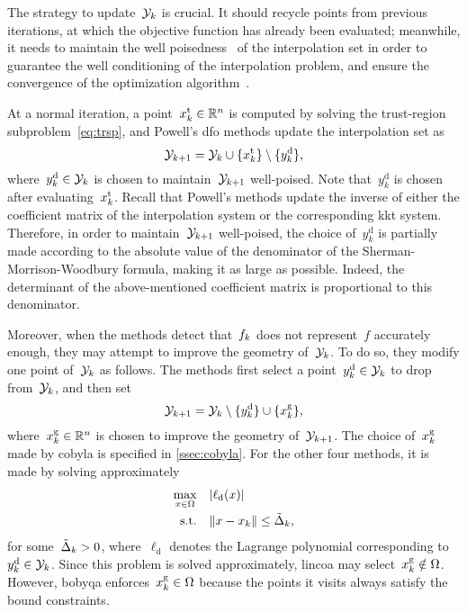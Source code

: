 \documentclass[11pt,draft]{article}
\numberwithin{equation}{section}
\newcommand{\R}{\mathbb{R}}
\newcommand{\abs}[2][]{#1\lvert#2#1\rvert}
\newcommand{\norm}[2][]{#1\lVert#2#1\rVert}
\newcommand{\set}[2][]{#1\{#2#1\}}
\newcommand{\drop}{{\text{d}}}
\newcommand{\fset}{\Omega}
\newcommand{\geo}{{\text{g}}}
\newcommand{\iter}[1][k]{x\ifthenelse{\equal{#1}{}}{}{_{#1}}}
\newcommand{\obj}{f}
\newcommand{\objm}[1][k]{\obj\ifthenelse{\equal{#1}{}}{}{_{#1}}}
\newcommand{\radalt}[1][k]{\tilde{\Delta}\ifthenelse{\equal{#1}{}}{}{_{#1}}}
\newcommand{\st}{\text{s.t.}}
\newcommand{\tst}{{\text{t}}}
\newcommand{\xpt}[1][k]{\mathcal{Y}\ifthenelse{\equal{#1}{}}{}{_{#1}}}
\begin{document}
The strategy to update~$\xpt$ is crucial.
It should recycle points from previous iterations, at which the objective function has already been evaluated; meanwhile, it needs to maintain the well poisedness~\cite{Sauer_Xu_1995,Conn_Scheinberg_Vicente_2009b} of the interpolation set in order to guarantee the well conditioning of the interpolation problem, and ensure the convergence of the optimization algorithm~\cite{Conn_Scheinberg_Vicente_2008a,Conn_Scheinberg_Vicente_2008b, Fasano_Morales_Nocedal_2009,Scheinberg_Toint_2010}.

At a normal iteration, a point~$\iter^{\tst} \in \R^n$ is computed by solving the trust-region subproblem~\cref{eq:trsp}, and Powell's \gls{dfo} methods update the interpolation set as
\begin{equation*}
    \xpt[k + 1] = \xpt \cup \set{\iter^{\tst}} \setminus \set{y_k^{\drop}},
\end{equation*}
where~$y_k^{\drop} \in \xpt$ is chosen to maintain~$\xpt[k + 1]$ well-poised.
Note that~$y_k^{\drop}$ is chosen after evaluating~$\iter^{\tst}$.
Recall that Powell's methods update the inverse of either the coefficient matrix of the interpolation system or the corresponding \gls{kkt} system.
Therefore, in order to maintain~$\xpt[k + 1]$ well-poised, the choice of~$y_k^{\drop}$ is partially made according to the absolute value of the denominator of the Sherman-Morrison-Woodbury formula, making it as large as possible.
Indeed, the determinant of the above-mentioned coefficient matrix is proportional to this denominator.

Moreover, when the methods detect that~$\objm$ does not represent~$\obj$ accurately enough, they may attempt to improve the geometry of~$\xpt$.
To do so, they modify one point of~$\xpt$ as follows.
The methods first select a point~$y_k^{\drop} \in \xpt$ to drop from~$\xpt$, and then set
\begin{equation}
    \label{eq:xpt-update-geo}
    \xpt[k + 1] = \xpt \setminus \set{y_k^{\drop}} \cup \set{\iter^{\geo}},
\end{equation}
where~$\iter^{\geo} \in \R^n$ is chosen to improve the geometry of~$\xpt[k + 1]$.
The choice of~$\iter^{\geo}$ made by \gls{cobyla} is specified in \cref{ssec:cobyla}.
For the other four methods, it is made by solving approximately
\begin{equation*}
    \label{eq:biglag}
    \begin{split}
        \max_{x \in \fset}  & \quad \abs{\ell_{\drop}(x)}\\
        \st                 & \quad \norm{x - \iter} \le \radalt,
    \end{split}
\end{equation*}
for some~$\radalt > 0$, where~$\ell_{\drop}$ denotes the Lagrange polynomial corresponding to~$y_k^{\drop} \in \xpt$.
Since this problem is solved approximately, \gls{lincoa} may select~$\iter^{\geo} \notin \fset$.
However, \gls{bobyqa} enforces~$\iter^{\geo} \in \fset$ because the points it visits always satisfy the bound constraints.
\end{document}
